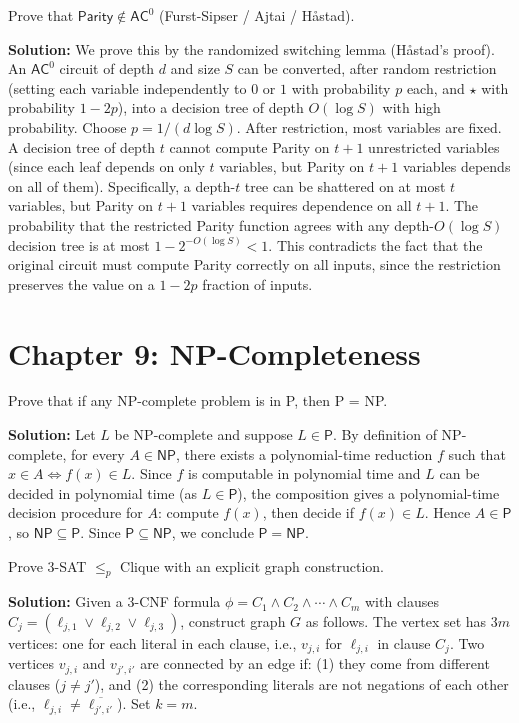 \begin{exercise}[Challenge]
Prove that $\mathsf{Parity} \notin \mathsf{AC}^0$ (Furst-Sipser / Ajtai / Håstad).
\end{exercise}
\textbf{Solution:} We prove this by the randomized switching lemma (Håstad's proof). An $\mathsf{AC}^0$ circuit of depth $d$ and size $S$ can be converted, after random restriction (setting each variable independently to $0$ or $1$ with probability $p$ each, and $\star$ with probability $1-2p$), into a decision tree of depth $O(\log S)$ with high probability. Choose $p = 1/(d \log S)$. After restriction, most variables are fixed. A decision tree of depth $t$ cannot compute Parity on $t+1$ unrestricted variables (since each leaf depends on only $t$ variables, but Parity on $t+1$ variables depends on all of them). Specifically, a depth-$t$ tree can be shattered on at most $t$ variables, but Parity on $t+1$ variables requires dependence on all $t+1$. The probability that the restricted Parity function agrees with any depth-$O(\log S)$ decision tree is at most $1 - 2^{-O(\log S)} < 1$. This contradicts the fact that the original circuit must compute Parity correctly on all inputs, since the restriction preserves the value on a $1-2p$ fraction of inputs.

\section{Chapter 9: NP-Completeness}

\begin{exercise}[Basic]
Prove that if any NP-complete problem is in P, then P = NP.
\end{exercise}
\textbf{Solution:} Let $L$ be NP-complete and suppose $L \in \mathsf{P}$. By definition of NP-complete, for every $A \in \mathsf{NP}$, there exists a polynomial-time reduction $f$ such that $x \in A \iff f(x) \in L$. Since $f$ is computable in polynomial time and $L$ can be decided in polynomial time (as $L \in \mathsf{P}$), the composition gives a polynomial-time decision procedure for $A$: compute $f(x)$, then decide if $f(x) \in L$. Hence $A \in \mathsf{P}$, so $\mathsf{NP} \subseteq \mathsf{P}$. Since $\mathsf{P} \subseteq \mathsf{NP}$, we conclude $\mathsf{P} = \mathsf{NP}$.

\begin{exercise}[Intermediate]
Prove 3-SAT $\le_p$ Clique with an explicit graph construction.
\end{exercise}
\textbf{Solution:} Given a 3-CNF formula $\phi = C_1 \land C_2 \land \cdots \land C_m$ with clauses $C_j = (\ell_{j,1} \lor \ell_{j,2} \lor \ell_{j,3})$, construct graph $G$ as follows. The vertex set has $3m$ vertices: one for each literal in each clause, i.e., $v_{j,i}$ for $\ell_{j,i}$ in clause $C_j$. Two vertices $v_{j,i}$ and $v_{j',i'}$ are connected by an edge if: (1) they come from different clauses ($j \neq j'$), and (2) the corresponding literals are not negations of each other (i.e., $\ell_{j,i} \neq \overline{\ell_{j',i'}}$). Set $k = m$.

